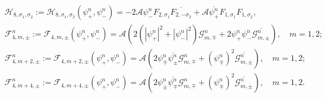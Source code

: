 \documentclass[final,leqno,showlabe]{siamltex}
\begin{document}
\begin{align}
&\mathcal{H}_{8,\sigma_1,\sigma_2}:=\mathcal{H}_{8,\sigma_1,\sigma_2}(\psi_+^n,\psi_-^n)=
-2\mathcal{A}\psi_-^nF_{2,\sigma_1}\overline{F_{2,-\sigma_2}}+ \mathcal{A}\overline{\psi_+^n}F_{1,\sigma_1}F_{1,\sigma_2},\nonumber\\
&\mathcal{F}_{4,m,\pm}^n:=\mathcal{F}_{4,m,\pm}(\psi_+^n,\psi_-^n)=
\mathcal{A}\left(2(|\psi_+^n|^2+|\psi_-^n|^2)\mathcal{G}_{m,\mp}^n+ 2\psi_+^n\psi_-^n\overline{\mathcal{G}_{m,\pm}^n}\right),\quad m=1,2;\nonumber\\
&\mathcal{F}_{4,m+2,\pm}^n:=\mathcal{F}_{4,m+2,\pm}(\psi_+^n,\psi_-^n)=
\mathcal{A}\left(2\psi_{\mp}^n\overline{\psi_{\pm}^n}\mathcal{G}_{m,\mp}^n+(\psi_\mp^n)^2\overline{\mathcal{G}_{m,\pm}^n}\right),\quad m=1,2;\nonumber\\
&\mathcal{F}_{4,m+4,\pm}^n:=\mathcal{F}_{4,m+4,\pm}(\psi_+^n,\psi_-^n)=
\mathcal{A}\left(2\psi_{\pm}^n\overline{\psi_{\mp}^n}\mathcal{G}_{m,\mp}^n+(\psi_\mp^n)^2\overline{\mathcal{G}_{m,\pm}^n}\right),\quad m=1,2.\nonumber
\end{align}
\end{document}
